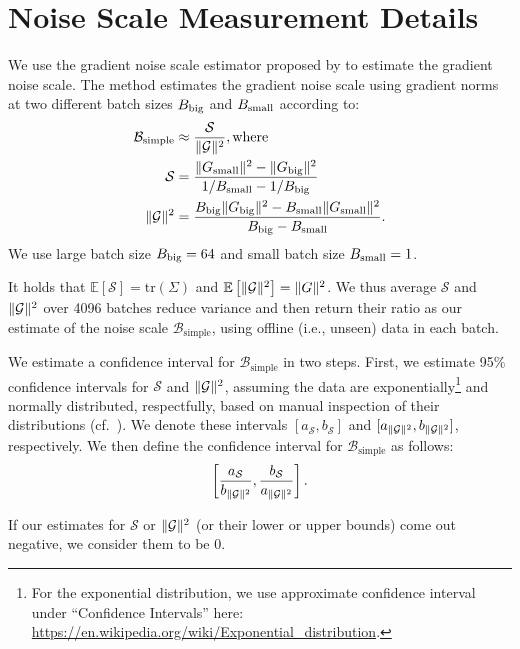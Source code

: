 \section{Noise Scale Measurement Details} \label{app:noise-scale}

We use the gradient noise scale estimator proposed by \citet[Appendix A]{mccandlish2018empirical} to estimate the gradient noise scale.
The method estimates the gradient noise scale using gradient norms at two different batch sizes $B_\mathrm{big}$ and $B_\mathrm{small}$ according to:
\begin{align*}
    \mathcal B_\mathrm{simple} &\approx \frac{\mathcal S}{\lVert\mathcal G\rVert^2} , \textrm{where} \\
    \mathcal S &= \frac{\lVert G_\mathrm{small}\rVert^2 - \lVert G_\mathrm{big}\rVert^2}{1/B_\mathrm{small} - 1/B_\mathrm{big}} \\
    \lVert\mathcal G\rVert^2 &= \frac{B_\mathrm{big} \lVert G_\mathrm{big}\rVert^2 - B_\mathrm{small} \lVert G_\mathrm{small}\rVert^2}{B_\mathrm{big} - B_\mathrm{small}} . \\
\end{align*}
We use large batch size $B_\mathrm{big} = 64$ and small batch size $B_\mathrm{small} = 1$.

It holds that $\mathbb{E} \left[ \mathcal S \right] = \mathrm{tr}(\Sigma)$ and $\mathbb{E} \left[ \lVert\mathcal G\rVert^2 \right] = \lVert G\rVert^2$. We thus average $\mathcal S$ and $\lVert\mathcal G\rVert^2$ over 4096 batches reduce variance and then return their ratio as our estimate of the noise scale $\mathcal B_\mathrm{simple}$, using offline (i.e., unseen) data in each batch.

We estimate a confidence interval for $\mathcal B_\mathrm{simple}$ in two steps. First, we estimate 95\% confidence intervals for $\mathcal S$ and $\lVert\mathcal G\rVert^2$, assuming the data are exponentially\footnote{For the exponential distribution, we use approximate confidence interval under ``Confidence Intervals'' here: \url{https://en.wikipedia.org/wiki/Exponential_distribution}.} and normally distributed, respectfully, based on manual inspection of their distributions (cf.~).
We denote these intervals $[a_{\mathcal S}, b_{\mathcal S}]$ and $[a_{\lVert\mathcal G\rVert^2}, b_{\lVert\mathcal G\rVert^2}]$, respectively.
We then define the confidence interval for $\mathcal B_\mathrm{simple}$ as follows:
\begin{equation*}
    \left[ \frac{a_{\mathcal S}}{b_{\lVert\mathcal G\rVert^2}}, \frac{b_{\mathcal S}}{a_{\lVert\mathcal G\rVert^2}} \right] .
\end{equation*}

If our estimates for $\mathcal S$ or $\lVert\mathcal G\rVert^2$ (or their lower or upper bounds) come out negative, we consider them to be 0.

